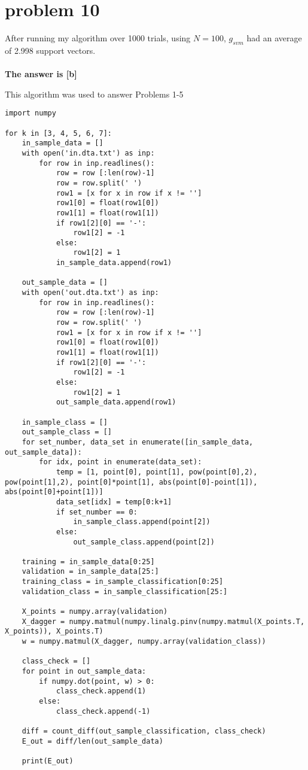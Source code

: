 \documentclass{article}
\begin{document}
\section*{problem 10}
After running my algorithm over 1000 trials, using $N=100$, $g_{svm}$ had an average of 2.998 support vectors.\\\\
\textbf{The answer is [b]}

\newpage
{\huge This algorithm was used to answer Problems 1-5}
\begin{verbatim}
import numpy

for k in [3, 4, 5, 6, 7]:
    in_sample_data = []
    with open('in.dta.txt') as inp:
        for row in inp.readlines():
            row = row [:len(row)-1]
            row = row.split(' ')
            row1 = [x for x in row if x != '']
            row1[0] = float(row1[0])
            row1[1] = float(row1[1])
            if row1[2][0] == '-':
                row1[2] = -1
            else:
                row1[2] = 1
            in_sample_data.append(row1)

    out_sample_data = []
    with open('out.dta.txt') as inp:
        for row in inp.readlines():
            row = row [:len(row)-1]
            row = row.split(' ')
            row1 = [x for x in row if x != '']
            row1[0] = float(row1[0])
            row1[1] = float(row1[1])
            if row1[2][0] == '-':
                row1[2] = -1
            else:
                row1[2] = 1
            out_sample_data.append(row1)
            
    in_sample_class = []
    out_sample_class = []
    for set_number, data_set in enumerate([in_sample_data, out_sample_data]):
        for idx, point in enumerate(data_set):
            temp = [1, point[0], point[1], pow(point[0],2), pow(point[1],2), point[0]*point[1], abs(point[0]-point[1]), abs(point[0]+point[1])]
            data_set[idx] = temp[0:k+1]
            if set_number == 0:
                in_sample_class.append(point[2])
            else:
                out_sample_class.append(point[2])

    training = in_sample_data[0:25]
    validation = in_sample_data[25:] 
    training_class = in_sample_classification[0:25]
    validation_class = in_sample_classification[25:]

    X_points = numpy.array(validation)
    X_dagger = numpy.matmul(numpy.linalg.pinv(numpy.matmul(X_points.T, X_points)), X_points.T)
    w = numpy.matmul(X_dagger, numpy.array(validation_class))
    
    class_check = []
    for point in out_sample_data:
        if numpy.dot(point, w) > 0:
            class_check.append(1)
        else:
            class_check.append(-1)
                
    diff = count_diff(out_sample_classification, class_check)
    E_out = diff/len(out_sample_data)
    
    print(E_out)    
\end{verbatim}
\end{document}
